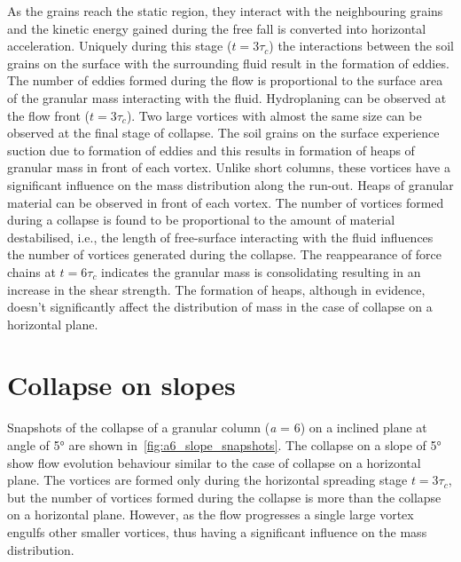 \documentclass[epj,twocolumn]{webofc}
\begin{document}
As the grains reach the static region, they interact with the neighbouring
grains and the kinetic energy gained during the free fall is converted into
horizontal acceleration. Uniquely during this stage ($t = 3\tau_c$) the
interactions between the soil grains on the surface with the surrounding
fluid result in the formation of eddies. The number of eddies formed during
the flow is proportional to the surface area of the granular mass interacting
with the fluid. Hydroplaning can be observed at the flow front ($t = 3\tau_c$).
Two large vortices with almost the same size can be observed at the final stage of 
collapse. The soil grains on the surface experience suction due to formation of 
eddies and this results in formation of heaps of granular mass in front of each
vortex. Unlike short columns, these vortices have 
a significant influence on the mass distribution along the run-out. Heaps of 
granular material can be observed in front of each vortex. The number of 
vortices formed during a collapse is found to be proportional to the amount of 
material destabilised, i.e., the length of free-surface interacting with the 
fluid influences the number of vortices generated during the collapse. The 
reappearance of force chains at $t = 6\tau_c$ indicates the 
granular mass is consolidating resulting in an increase in the shear strength. 
The formation of heaps, although in evidence, doesn't significantly 
affect the distribution of mass in the case of collapse on a horizontal plane. 



\section{Collapse on slopes}
Snapshots of the collapse of a granular column (\textit{a} = 6) on a inclined 
plane at angle of 5\si{\degree} are shown in~\cref{fig:a6_slope_snapshots}. 
The collapse on a slope of 5\si{\degree} show flow evolution behaviour similar 
to the case of collapse on a horizontal plane. The vortices are formed only 
during the horizontal spreading stage $t = 3\tau_c$, but the number of vortices 
formed during the collapse is more than the collapse on a horizontal plane. 
However, as the flow progresses a single large vortex engulfs other smaller 
vortices, thus having a significant influence on the mass 
distribution.
\end{document}
